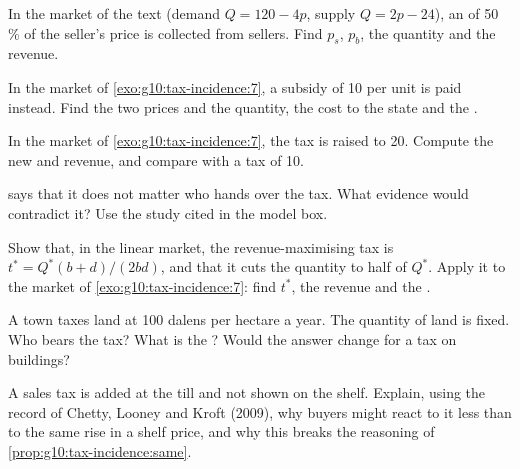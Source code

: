 \begin{exercise}[$\star\star$]\label{exo:g10:tax-incidence:9}
In the market of the text (demand $Q = 120 - 4p$, supply $Q = 2p - 24$), an  of 50\,\% of the seller's price is collected from sellers. Find $p_s$, $p_b$, the quantity and the
revenue.
\end{exercise}

\begin{exercise}[$\star\star$]\label{exo:g10:tax-incidence:10}
In the market of \cref{exo:g10:tax-incidence:7}, a subsidy of 10 per unit is paid instead. Find the two prices and the quantity, the cost to the state and the .
\end{exercise}

\begin{exercise}[$\star\star$]\label{exo:g10:tax-incidence:11}
In the market of \cref{exo:g10:tax-incidence:7}, the tax is raised to 20. Compute the new  and revenue, and compare with a tax of 10.
\end{exercise}

\begin{exercise}[$\star\star\star$]\label{exo:g10:tax-incidence:12}
 says that it does not matter who hands over the tax. What evidence would contradict it? Use the study cited in the model box.
\end{exercise}

\begin{exercise}[$\star\star\star$]\label{exo:g10:tax-incidence:13}
Show that, in the linear market, the revenue-maximising tax is $t^* = Q^*(b + d)/(2bd)$, and that it cuts the quantity to half of $Q^*$. Apply it to the market of
\cref{exo:g10:tax-incidence:7}: find $t^*$, the revenue and the .
\end{exercise}

\begin{exercise}[$\star\star\star$]\label{exo:g10:tax-incidence:14}
A town taxes land at 100 dalens per hectare a year. The quantity of land is fixed. Who bears the tax? What is the ? Would the answer change for a tax on buildings?
\end{exercise}

\begin{exercise}[$\star\star\star$]\label{exo:g10:tax-incidence:15}
A sales tax is added at the till and not shown on the shelf. Explain, using the record of Chetty, Looney and Kroft (2009), why buyers might react to it less than to the same rise in a
shelf price, and why this breaks the reasoning of \cref{prop:g10:tax-incidence:same}.
\end{exercise}

